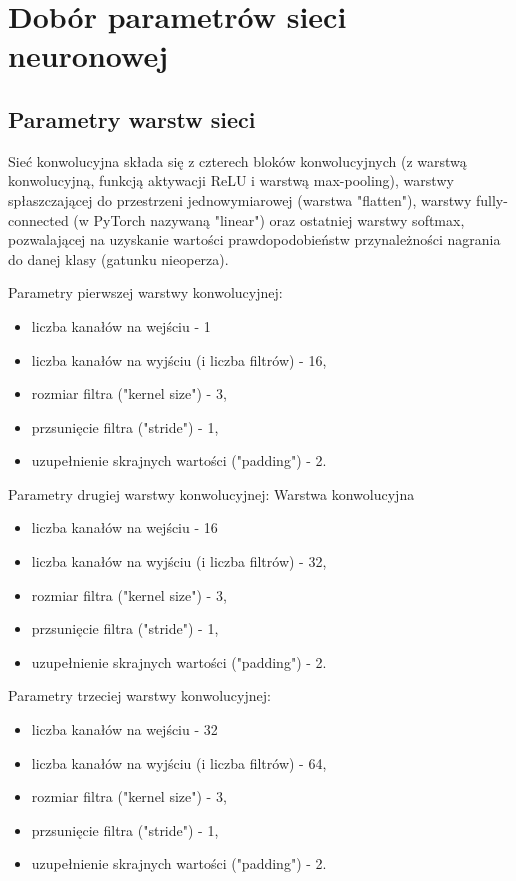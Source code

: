 \documentclass{sprz}
\begin{document}
\section{Dobór parametrów sieci neuronowej}

\subsection{Parametry warstw sieci}
Sieć konwolucyjna składa się z czterech bloków konwolucyjnych (z warstwą konwolucyjną, funkcją aktywacji ReLU i warstwą max-pooling), warstwy spłaszczającej do przestrzeni jednowymiarowej (warstwa "flatten"), warstwy fully-connected (w PyTorch nazywaną "linear") oraz ostatniej warstwy softmax, pozwalającej na uzyskanie wartości prawdopodobieństw przynależności nagrania do danej klasy (gatunku nieoperza).

Parametry pierwszej warstwy konwolucyjnej:
\begin{itemize}
  \item{liczba kanałów na wejściu - 1}
  \item{liczba kanałów na wyjściu (i liczba filtrów) - 16,}
  \item{rozmiar filtra ("kernel size") - 3,}
  \item {przsunięcie filtra ("stride") - 1,}
  \item{uzupełnienie skrajnych wartości ("padding") - 2.}
\end{itemize}


Parametry drugiej warstwy konwolucyjnej:
Warstwa konwolucyjna
\begin{itemize}
  \item{liczba kanałów na wejściu - 16}
  \item{liczba kanałów na wyjściu (i liczba filtrów) - 32,}
  \item{rozmiar filtra ("kernel size") - 3,}
  \item {przsunięcie filtra ("stride") - 1,}
  \item{uzupełnienie skrajnych wartości ("padding") - 2.}
\end{itemize}


Parametry trzeciej warstwy konwolucyjnej:
\begin{itemize}
  \item{liczba kanałów na wejściu - 32}
  \item{liczba kanałów na wyjściu (i liczba filtrów) - 64,}
  \item{rozmiar filtra ("kernel size") - 3,}
  \item {przsunięcie filtra ("stride") - 1,}
  \item{uzupełnienie skrajnych wartości ("padding") - 2.}
\end{itemize}
\end{document}
